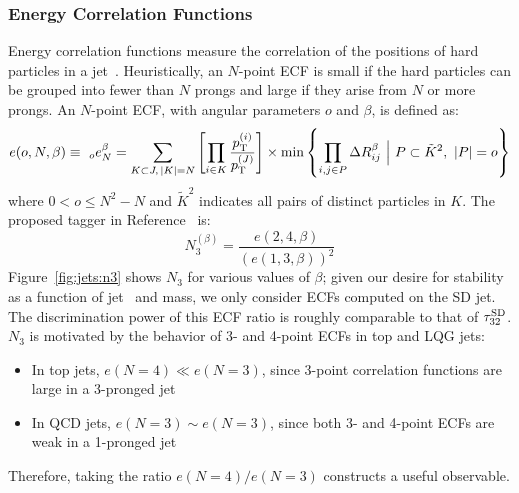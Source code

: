 \subsubsection{Energy Correlation Functions}

Energy correlation functions measure the correlation of the positions of hard particles in a jet~\cite{ecf}. 
Heuristically, an $N$-point ECF is small if the hard particles can be grouped into fewer than $N$ prongs and large if they arise from $N$ or more prongs. 
An $N$-point ECF, with angular parameters $o$ and $\beta$, is defined as:
\begin{equation}
    e(o,N,\beta) \equiv 
    ~_o e_N^\beta = 
    \sum _{K\subset J,\,|K|=N} 
    \left[\prod_{i\in K} \frac{p_\mathrm{T}^{(i)}}{p_\mathrm{T}^{(J)}}\right] \times 
    \min\left\{ \prod_{i,j\in P} \Delta R_{ij}^\beta 
        ~\Big|~ P \subset \tilde{K}^2 ,~|P|=o\right\}
\end{equation}
where $0 < o \leq N^2-N$ and $\tilde K^2$ indicates all pairs of distinct particles in $K$. 
The proposed tagger in Reference~\cite{ecf} is:
\begin{equation}
    N_3^{(\beta)} = \frac{e(2,4,\beta)}{(e(1,3,\beta))^2}
\end{equation}
Figure~\ref{fig:jets:n3} shows $N_3$ for various values of $\beta$; given our desire for stability as a function of jet \pt~and mass, we only consider ECFs computed on the SD jet. 
The discrimination power of this ECF ratio is roughly comparable to that of $\tau_{32}^{\mathrm{SD}}$. 
$N_3$ is motivated by the behavior of 3- and 4-point ECFs in top and LQG jets:
\begin{itemize}
    \item In top jets, $e(N=4) \ll e(N=3)$, since 3-point correlation functions are large in a 3-pronged jet
    \item In QCD jets, $e(N=3) \sim e(N=3)$, since both 3- and 4-point ECFs are weak in a 1-pronged jet
\end{itemize}
Therefore, taking the ratio $e(N=4)/e(N=3)$ constructs a useful observable. 

